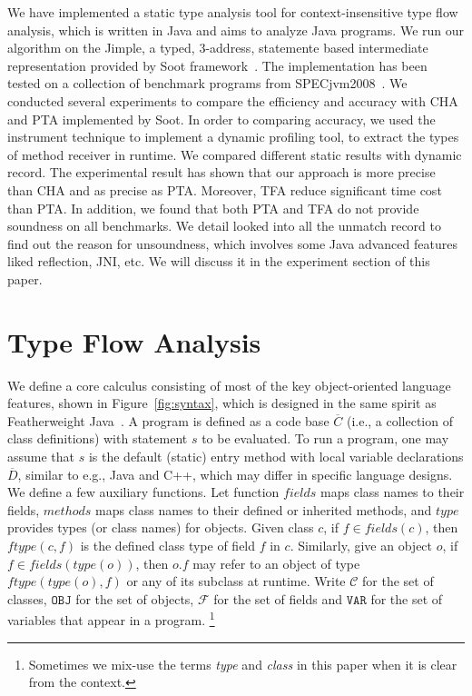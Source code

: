 \documentclass{fac}
\newcommand{\keyword}[1]{\mathsf{#1}}
\newcommand{\kwnull}[0]{\keyword{null}}
\newcommand\Var{\mathtt{VAR}}
\newcommand\Val{\mathtt{V}}
\newcommand\Obj{\mathtt{OBJ}}
\newcommand{\Class}{\mathcal{C}}
\newcommand{\Field}{\mathcal{F}}
\newcommand\set[1]{\{#1\}}
\begin{document}
We have implemented a static type analysis tool for context-insensitive type flow analysis, which is written in Java and aims to analyze Java programs. We run our algorithm on the Jimple, a typed, 3-address, statemente based intermediate representation provided by Soot framework~\cite{soot}. The implementation has been tested on a collection of benchmark programs from SPECjvm2008~\cite{specjvm}. We conducted several experiments to compare the efficiency and accuracy with CHA and PTA implemented by Soot. In order to comparing accuracy, we used the instrument technique to implement a dynamic profiling tool, to extract the types of method receiver in runtime. We compared different static results with dynamic record. The experimental result has shown that our approach is more precise than CHA and as precise as PTA. Moreover, TFA reduce significant time cost than PTA. In addition, we found that both PTA and TFA do not provide soundness on all benchmarks. We detail looked into all the unmatch record to find out the reason for unsoundness, which involves some Java advanced features liked reflection, JNI, etc. We will discuss it in the experiment section of this paper. %

\section{Type Flow Analysis}\label{sec:type-flow-analysis}

We define a core calculus consisting of most of the key object-oriented language features, shown in Figure~\ref{fig:syntax}, which is designed in the same spirit as Featherweight Java~\cite{Igarashi2001}.
A program is defined as a code base $\overline{C}$ (i.e., a collection of class definitions) with statement $s$ to be evaluated.
To run a program, one may assume that $s$ is the default (static) entry method with local variable declarations $\overline{D}$,
similar to e.g., Java and C++, which may differ in specific language designs.
We define a few auxiliary functions. Let function $fields$ maps class names to their fields, $methods$ maps class names to their defined or inherited methods, and $type$ provides types (or class names) for objects. Given class $c$, if $f\in fields(c)$, then $ftype(c,f)$ is the defined class type of field $f$ in $c$. Similarly, give an object $o$, if $f\in fields(type(o))$, then $o.f$ may refer to an object of type $ftype(type(o),f)$ or %
any of its subclass at runtime. Write $\Class$ for the set of classes, $\Obj$ for the set of objects, $\Field$ for the set of fields and $\Var$ for the set of variables that appear in a program.
\footnote{Sometimes we mix-use the terms \emph{type} and \emph{class} in this paper when it is clear from the context.}
\end{document}
